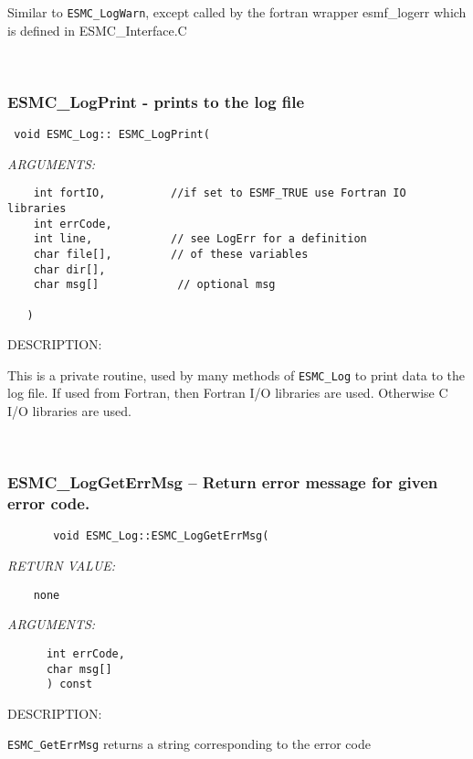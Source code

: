    Similar to {\tt ESMC\_LogWarn}, except called by the fortran
   wrapper esmf\_logerr which is
   defined in ESMC\_Interface.C 
 
\mbox{}\hrulefill\ 
 

  \subsubsection [ESMC\_LogPrint] {ESMC\_LogPrint - prints to the log file}


   
\begin{verbatim} 
 void ESMC_Log:: ESMC_LogPrint(
 \end{verbatim}{\em ARGUMENTS:}
\begin{verbatim} 
    int fortIO,          //if set to ESMF_TRUE use Fortran IO libraries
    int errCode,
    int line,            // see LogErr for a definition
    char file[],         // of these variables
    char dir[],           
    char msg[]            // optional msg
 
   )
 \end{verbatim}
{\sf DESCRIPTION:\\ }

This is a private routine, used by many methods of 
   {\tt ESMC\_Log} to print data to the log file. If used from Fortran, then
   Fortran I/O libraries are used.  Otherwise C I/O libraries are used. 
 
\mbox{}\hrulefill\ 
 
\subsubsection [ESMC\_LogGetErrMsg] {ESMC\_LogGetErrMsg -- Return error message for given error code.}


  
\begin{verbatim}       void ESMC_Log::ESMC_LogGetErrMsg(\end{verbatim}{\em RETURN VALUE:}
\begin{verbatim}    none\end{verbatim}{\em ARGUMENTS:}
\begin{verbatim}      int errCode,
      char msg[]
      ) const\end{verbatim}
{\sf DESCRIPTION:\\ }


   {\tt ESMC\_GetErrMsg} returns a string corresponding to the error code
  
